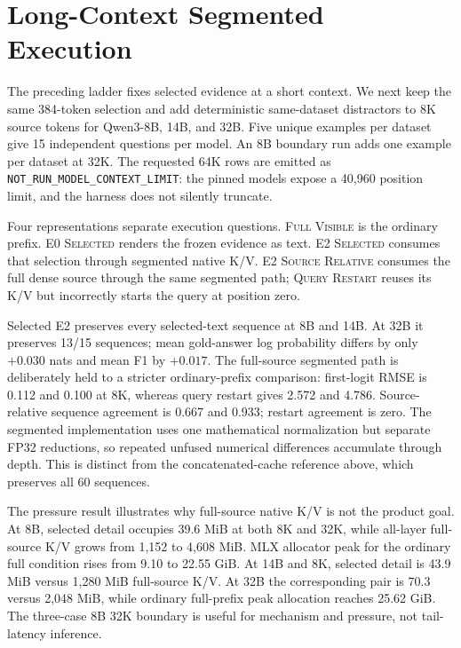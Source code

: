 \documentclass[10pt]{article}
\begin{document}
\section{Long-Context Segmented Execution}
\label{sec:mlx-long-context}

The preceding ladder fixes selected evidence at a short context. We next keep
the same 384-token selection and add deterministic same-dataset distractors to
8K source tokens for Qwen3-8B, 14B, and 32B. Five unique examples per dataset
give 15 independent questions per model. An 8B boundary run adds one example
per dataset at 32K. The requested 64K rows are emitted as
\texttt{NOT\_RUN\_MODEL\_CONTEXT\_LIMIT}: the pinned models expose a 40,960
position limit, and the harness does not silently truncate.

Four representations separate execution questions. \textsc{Full Visible} is
the ordinary prefix. \textsc{E0 Selected} renders the frozen evidence as text.
\textsc{E2 Selected} consumes that selection through segmented native K/V.
\textsc{E2 Source Relative} consumes the full dense source through the same
segmented path; \textsc{Query Restart} reuses its K/V but incorrectly starts the
query at position zero.

\begin{table}[H]
\centering
\scriptsize
\caption{Long-context MLX calibration. $\Delta$LP is full visible minus
selected text. Selected E2 agreement compares the two frozen selected-evidence
representations. Source/restart columns compare full native K/V with the
ordinary full prefix.}
\resizebox{\linewidth}{!}{}
\label{tab:mlx-long-context}
\end{table}

Selected E2 preserves every selected-text sequence at 8B and 14B. At 32B it
preserves 13/15 sequences; mean gold-answer log probability differs by only
$+0.030$ nats and mean F1 by $+0.017$. The full-source segmented path is deliberately held to a stricter
ordinary-prefix comparison: first-logit RMSE is 0.112 and 0.100 at 8K, whereas
query restart gives 2.572 and 4.786. Source-relative sequence agreement is
0.667 and 0.933; restart agreement is zero. The segmented implementation uses
one mathematical normalization but separate FP32 reductions, so repeated
unfused numerical differences accumulate through depth. This is distinct from
the concatenated-cache reference above, which preserves all 60 sequences.

The pressure result illustrates why full-source native K/V is not the product
goal. At 8B, selected detail occupies 39.6 MiB at both 8K and 32K, while
all-layer full-source K/V grows from 1,152 to 4,608 MiB. MLX allocator peak for
the ordinary full condition rises from 9.10 to 22.55 GiB. At 14B and 8K,
selected detail is 43.9 MiB versus 1,280 MiB full-source K/V. At 32B the
corresponding pair is 70.3 versus 2,048 MiB, while ordinary full-prefix peak
allocation reaches 25.62 GiB. The three-case 8B
32K boundary is useful for mechanism and pressure, not tail-latency inference.
\end{document}
